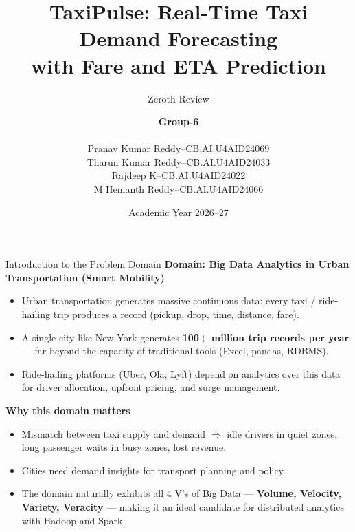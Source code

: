 \documentclass[aspectratio=169]{beamer}
\title[TaxiPulse]{TaxiPulse: Real-Time Taxi Demand Forecasting\\ with Fare and ETA Prediction}
\subtitle{Zeroth Review}
\author[Team TaxiPulse]{%
  \textbf{Group-6}\\[4pt]
  \begin{tabular}{@{}l c l@{}}
    Pranav Kumar Reddy & -- & CB.AI.U4AID24069 \\
    Tharun Kumar Reddy & -- & CB.AI.U4AID24033 \\
    Rajdeep K          & -- & CB.AI.U4AID24022 \\
    M Hemanth Reddy    & -- & CB.AI.U4AID24066 \\
  \end{tabular}}
\institute[]{Department of Artificial Intelligence and Data Science\\[2pt]
  \textbf{23AID302 -- Big Data Analytics}}
\date{Academic Year 2026--27}
\begin{document}
\begin{frame}
  \titlepage
\end{frame}

\begin{frame}{Introduction to the Problem Domain}
  \textbf{Domain: Big Data Analytics in Urban Transportation (Smart Mobility)}
  \begin{itemize}
    \item Urban transportation generates massive continuous data: every taxi /
          ride-hailing trip produces a record (pickup, drop, time, distance, fare).
    \item A single city like New York generates \textbf{100+ million trip records
          per year} --- far beyond the capacity of traditional tools (Excel, pandas, RDBMS).
    \item Ride-hailing platforms (Uber, Ola, Lyft) depend on analytics over this
          data for driver allocation, upfront pricing, and surge management.
  \end{itemize}
  \vspace{4pt}
  \textbf{Why this domain matters}
  \begin{itemize}
    \item Mismatch between taxi supply and demand $\Rightarrow$ idle drivers in
          quiet zones, long passenger waits in busy zones, lost revenue.
    \item Cities need demand insights for transport planning and policy.
    \item The domain naturally exhibits all 4 V's of Big Data ---
          \textbf{Volume, Velocity, Variety, Veracity} --- making it an ideal
          candidate for distributed analytics with Hadoop and Spark.
  \end{itemize}
\end{frame}
\end{document}
